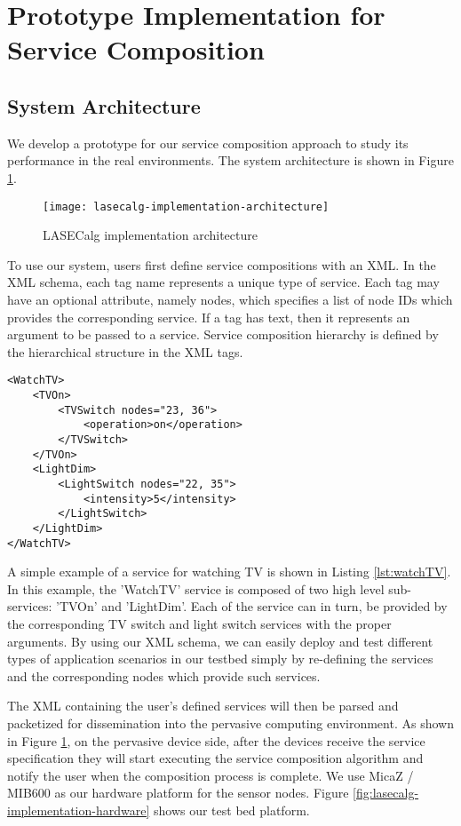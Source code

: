 \section{Prototype Implementation for Service Composition}
\label{sec:implementation}

\subsection{System Architecture}
We develop a prototype for our service composition approach to study its performance in the real environments. The system architecture is shown in Figure \ref{fig:lasecalg-implementation-architecture}.

\begin{figure}
\centering
\texttt{[image: lasecalg-implementation-architecture]}
\caption{LASECalg implementation architecture}
\label{fig:lasecalg-implementation-architecture}
\end{figure}

To use our system, users first define service compositions with an XML. In the XML schema, each tag name represents a unique type of service. Each tag may have an optional attribute, namely nodes, which specifies a list of node IDs which provides the corresponding service. If a tag has text, then it represents an argument to be passed to a service. Service composition hierarchy is defined by the hierarchical structure in the XML tags.

\begin{lstlisting}[caption=A simple service for switching on TV, label=lst:watchTV]
<WatchTV>
	<TVOn>
		<TVSwitch nodes="23, 36">
			<operation>on</operation>
		</TVSwitch>
	</TVOn>
	<LightDim>
		<LightSwitch nodes="22, 35">
			<intensity>5</intensity>
		</LightSwitch>
	</LightDim>
</WatchTV>
\end{lstlisting}

A simple example of a service for watching TV is shown in Listing \ref{lst:watchTV}. In this example, the 'WatchTV' service is composed of two high level sub-services: 'TVOn' and 'LightDim'. Each of the service can in turn, be provided by the corresponding TV switch and light switch services with the proper arguments. By using our XML schema, we can easily deploy and test different types of application scenarios in our testbed simply by re-defining the services and the corresponding nodes which provide such services.

The XML containing the user's defined services will then be parsed and packetized for dissemination into the pervasive computing environment. As shown in Figure \ref{fig:lasecalg-implementation-architecture}, on the pervasive device side, after the devices receive the service specification they will start executing the service composition algorithm and notify the user when the composition process is complete. We use MicaZ / MIB600 as our hardware platform for the sensor nodes. Figure \ref{fig:lasecalg-implementation-hardware} shows our test bed platform.

